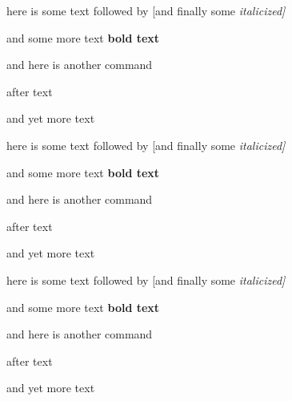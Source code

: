 here is some text followed by [and finally some \itshape{italicized}]

and
some more text \textbf{bold text}

and here is another command 

after text 

and yet more text

here is some text followed by [and finally some \itshape{italicized}]

and
some more text \textbf{bold text}

and here is another command 

after text 

and yet more text

here is some text followed by [and finally some \itshape{italicized}]

and
some more text \textbf{bold text}

and here is another command 

after text 

and yet more text
